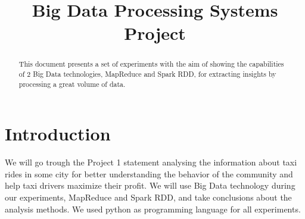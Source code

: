 \documentclass[conference,compsoc]{IEEEtran}
\begin{document}
%
\title{Big Data Processing Systems\\ Project}


\author{

}




\maketitle

\begin{abstract}
This document presents a set of experiments with the aim of showing the capabilities of 2 Big Data technologies, MapReduce and Spark RDD, for extracting insights by processing a great volume of data.
\end{abstract}





%
\IEEEpeerreviewmaketitle




\section{Introduction}
We will go trough the Project 1 statement\cite{IEEEhowto:bdpsp1} analysing the  information about taxi rides in some city for better understanding the behavior of the community and help taxi drivers maximize their profit. We will use Big Data technology during our experiments, MapReduce and Spark RDD, and take conclusions about the analysis methods. We used python as programming language for all experiments.
\end{document}
